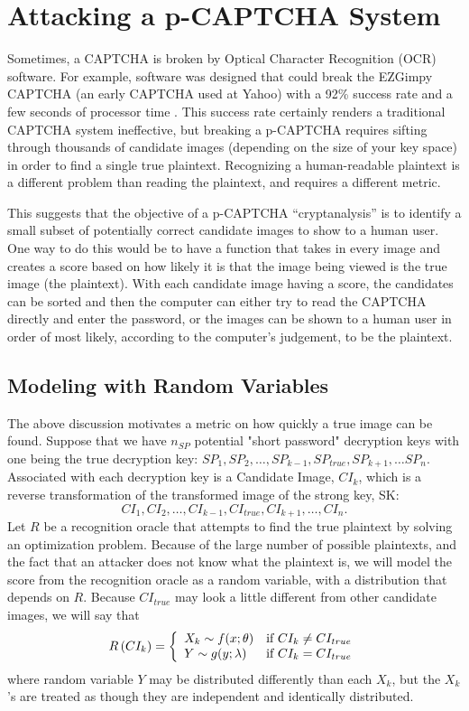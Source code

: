 \documentclass[12pt]{article}
\begin{document}
\section*{Attacking a p-CAPTCHA System}
Sometimes, a CAPTCHA is broken by Optical Character Recognition (OCR) software. For example, software was designed that could break the EZGimpy CAPTCHA (an early CAPTCHA used at Yahoo) with a 92\% success rate and a few seconds of processor time \cite{mori}. This success rate certainly renders a traditional CAPTCHA system ineffective, but breaking a p-CAPTCHA requires sifting through thousands of candidate images (depending on the size of your key space) in order to find a single true plaintext. Recognizing a human-readable plaintext is a different problem than reading the plaintext, and requires a different metric.

This suggests that the objective of a p-CAPTCHA “cryptanalysis” is to identify a small subset of potentially correct candidate images to show to a human user. One way to do this would be to have a function that takes in every image and creates a score based on how likely it is that the image being viewed is the true image (the plaintext). With each candidate image having a score, the candidates can be sorted and then the computer can either try to read the CAPTCHA directly and enter the password, or the images can be shown to a human user in order of most likely, according to the computer's judgement, to be the plaintext.

\subsection*{Modeling with Random Variables}
The above discussion motivates a metric on how quickly a true image can be found. Suppose that we have $n_{SP}$ potential "short password" decryption keys with one being the true decryption key: 
$SP_1, SP_2, \ldots, SP_{k-1}, SP_{true}, SP_{k+1}, \ldots SP_n$.
Associated with each decryption key is a Candidate Image, $CI_k$, which is a reverse transformation of the transformed image of the strong key, SK:
$$CI_1, CI_2, \ldots, CI_{k-1}, CI_{true}, CI_{k+1}, \ldots, CI_n.$$
Let $R$ be a recognition oracle that attempts to find the true plaintext by solving an optimization problem. Because of the large number of possible plaintexts, and the fact that an attacker does not know what the plaintext is, we will model the score from the recognition oracle as a random variable, with a distribution that depends on $R$. Because $CI_{true}$ may look a little different from other candidate images, we will say that
\begin{displaymath}
   R\left(CI_k\right) = \left\{
     \begin{array}{lr}
       X_k \sim f(x; \mathbf{\theta}) & \hbox{if } CI_k \neq CI_{true}\\
       Y \sim g(y; \mathbf{\lambda}) & \hbox{if } CI_k = CI_{true}
     \end{array}
   \right.
\end{displaymath}
where random variable $Y$ may be distributed differently than each $X_k$, but the $X_k$'s are treated as though they are independent and identically distributed.
\end{document}
